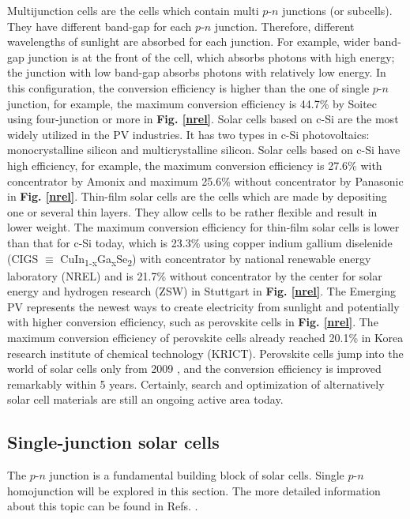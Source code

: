 \documentclass[a4paper, 12pt, titlepage,oneside,drop]{kthesis}
\begin{document}
Multijunction cells are the cells which contain multi $p$-$n$ junctions (or subcells). They have different band-gap for each $p$-$n$ junction.
Therefore, different wavelengths of sunlight are absorbed for each junction. For example, wider band-gap junction is at the front of the cell, which absorbs photons with high energy; the junction with 
low band-gap absorbs photons with relatively low energy. In this configuration, the conversion efficiency is higher than the one of single $p$-$n$ junction, for example, the maximum conversion efficiency is 44.7\% by Soitec \cite{dimroth2014wafer} using 
four-junction or more in \textbf{Fig. \ref{nrel}}. Solar cells based on c-Si are the most widely utilized in the PV industries. It has two types in
c-Si photovoltaics: monocrystalline silicon and multicrystalline silicon. Solar cells based on c-Si have high efficiency, for example, the maximum conversion efficiency is 27.6\% with concentrator 
by Amonix \cite{jones2009new} and maximum 25.6\% without concentrator by Panasonic \cite{panasonic} in \textbf{Fig. \ref{nrel}}. Thin-film solar cells are the cells which are made by depositing one or several thin layers. 
They allow cells to be rather 
flexible and result in lower weight. The maximum conversion efficiency for thin-film solar cells is lower than that for c-Si today, which is 23.3\% using copper indium gallium diselenide (CIGS $\equiv$ CuIn\textsubscript{1-x}Ga\textsubscript{x}Se\textsubscript{2}) with concentrator by national renewable energy laboratory (NREL) \cite{ward2014cu} and 
is 21.7\% without concentrator by the center for solar energy and hydrogen research (ZSW) in Stuttgart \cite{zsw} in \textbf{Fig. \ref{nrel}}. The Emerging PV represents the newest ways to create electricity from
sunlight and potentially with higher conversion efficiency, such as perovskite cells in \textbf{Fig. \ref{nrel}}. The maximum conversion efficiency of perovskite cells already reached 20.1\% in Korea research institute of chemical technology (KRICT)\cite{green2015solar}. 
Perovskite cells jump into the world of solar cells only from 2009 \cite{green2014emergence, mcgehee2014perovskite}, and the conversion efficiency is improved remarkably within 5 years. Certainly, search and optimization 
of alternatively solar cell materials are still an ongoing active area today.


\subsection{Single-junction solar cells}
The $p$-$n$ junction is a fundamental building block of solar cells. Single $p$-$n$ homojunction will be explored in this section. The more detailed information about this topic can be found in Refs. \cite{bok1,sproul2003understanding, neamen2003semiconductor}.
\end{document}
